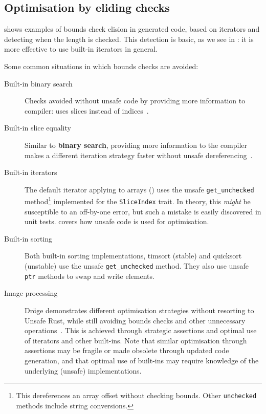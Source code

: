 \documentclass[dissertation.tex]{subfiles}
\begin{document}
\subsection{Optimisation by eliding checks}
 shows examples of bounds check elision in
generated code, based on iterators and detecting when the length is
checked.
This detection is basic, as we see in : it
is more effective to use built-in iterators in general.

Some common situations in which bounds checks are avoided:

\begin{description}
    \item[Built-in binary search] Checks avoided without unsafe code by
    providing more information to compiler: uses slices instead of
    indices~\cite{rust-pr-binarysearch}.
    \item[Built-in slice equality] Similar to \textbf{binary search},
    providing more information to the compiler makes a different
    iteration strategy faster without unsafe dereferencing~\cite{rust-pr-slice-partialeq}.
    \item[Built-in iterators] The default iterator applying to arrays
    () uses the unsafe
    \texttt{get\_unchecked} method\footnote{
        This dereferences an array offset without checking bounds.
        Other \texttt{unchecked} methods include string conversions.
    } implemented for the \texttt{SliceIndex} trait.
    In theory, this \emph{might} be susceptible to an off-by-one error,
    but such a mistake is easily discovered in unit tests.
     covers how unsafe code is used for
    optimisation.
    \item[Built-in sorting] Both built-in sorting implementations,
    timsort (stable) and quicksort (unstable) use the unsafe
    \texttt{get\_unchecked} method.
    They also use unsafe \texttt{ptr} methods to swap and write
    elements.
    \item[Image processing] Dr\"oge demonstrates different optimisation
    strategies without resorting to Unsafe Rust, while still avoiding
    bounds checks and other unnecessary operations~\cite{droge-opt}.
    This is achieved through strategic assertions and optimal use of
    iterators and other built-ins.
    Note that similar optimisation through assertions may be fragile or
    made obsolete through updated code generation, and that optimal use
    of built-ins may require knowledge of the underlying (unsafe)
    implementations.
\end{description}
\end{document}

